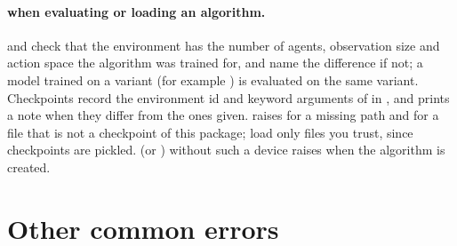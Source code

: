 \paragraph{ when evaluating or loading an algorithm.}
 and  check that the
environment has the number of agents, observation size and action space the
algorithm was trained for, and name the difference if not; a model trained on
a variant (for example ) is evaluated on the same variant.
Checkpoints record the environment id and keyword arguments of
 in , and  prints a
note when they differ from the ones given.  raises
 for a missing path and  for a file
that is not a checkpoint of this package; load only files you trust, since
checkpoints are pickled.  (or ) without such a
device raises  when the algorithm is created.

\section{Other common errors}\label{sec:trouble-other}

